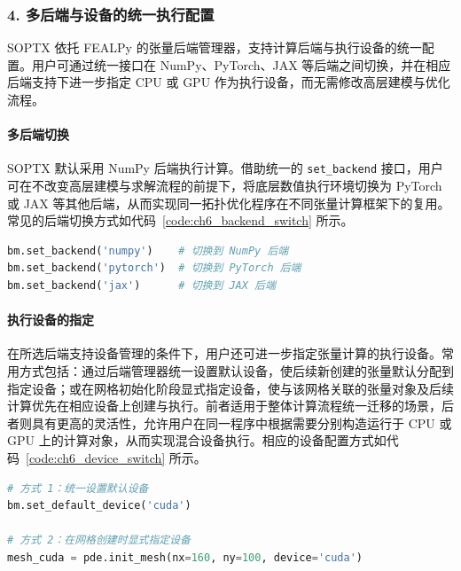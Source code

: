 \subsubsection*{4. 多后端与设备的统一执行配置}

SOPTX 依托 FEALPy 的张量后端管理器，支持计算后端与执行设备的统一配置。用户可通过统一接口在 NumPy、PyTorch、JAX 等后端之间切换，并在相应后端支持下进一步指定 CPU 或 GPU 作为执行设备，而无需修改高层建模与优化流程。

\paragraph*{多后端切换}

SOPTX 默认采用 NumPy 后端执行计算。借助统一的 \texttt{set\_backend} 接口，用户可在不改变高层建模与求解流程的前提下，将底层数值执行环境切换为 PyTorch 或 JAX 等其他后端，从而实现同一拓扑优化程序在不同张量计算框架下的复用。常见的后端切换方式如代码~\ref{code:ch6_backend_switch} 所示。
\begin{lstlisting}[language=Python, 
	caption={多后端切换的统一配置接口}, 
	label={code:ch6_backend_switch}, 
	basicstyle=\footnotesize\ttfamily,
	]
bm.set_backend('numpy')    # 切换到 NumPy 后端
bm.set_backend('pytorch')  # 切换到 PyTorch 后端
bm.set_backend('jax')      # 切换到 JAX 后端
\end{lstlisting}

\paragraph*{执行设备的指定}

在所选后端支持设备管理的条件下，用户还可进一步指定张量计算的执行设备。常用方式包括：通过后端管理器统一设置默认设备，使后续新创建的张量默认分配到指定设备；或在网格初始化阶段显式指定设备，使与该网格关联的张量对象及后续计算优先在相应设备上创建与执行。前者适用于整体计算流程统一迁移的场景，后者则具有更高的灵活性，允许用户在同一程序中根据需要分别构造运行于 CPU 或 GPU 上的计算对象，从而实现混合设备执行。相应的设备配置方式如代码~\ref{code:ch6_device_switch} 所示。
\begin{lstlisting}[language=Python,
	caption={异构设备切换的统一配置接口},
	label={code:ch6_device_switch},
	basicstyle=\footnotesize\ttfamily,
]
# 方式 1：统一设置默认设备
bm.set_default_device('cuda')

# 方式 2：在网格创建时显式指定设备
mesh_cuda = pde.init_mesh(nx=160, ny=100, device='cuda')
\end{lstlisting}


